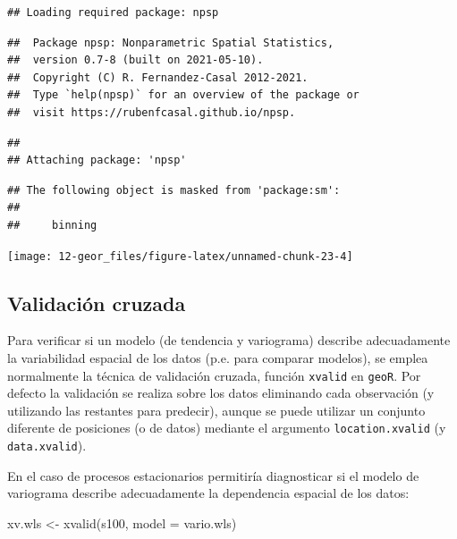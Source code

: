 \documentclass[
  spanish,
]{book}
\newenvironment{Shaded}{\begin{snugshade}}{\end{snugshade}}
\newcommand{\AttributeTok}[1]{\textcolor[rgb]{0.77,0.63,0.00}{#1}}
\newcommand{\FunctionTok}[1]{\textcolor[rgb]{0.00,0.00,0.00}{#1}}
\newcommand{\NormalTok}[1]{#1}
\newcommand{\OtherTok}[1]{\textcolor[rgb]{0.56,0.35,0.01}{#1}}
\theoremstyle{break}
\theoremstyle{definition}
\theoremstyle{definition}
\theoremstyle{definition}
\theoremstyle{definition}
\theoremstyle{remark}
\begin{document}
\begin{verbatim}
## Loading required package: npsp
\end{verbatim}

\begin{verbatim}
##  Package npsp: Nonparametric Spatial Statistics,
##  version 0.7-8 (built on 2021-05-10).
##  Copyright (C) R. Fernandez-Casal 2012-2021.
##  Type `help(npsp)` for an overview of the package or
##  visit https://rubenfcasal.github.io/npsp.
\end{verbatim}

\begin{verbatim}
## 
## Attaching package: 'npsp'
\end{verbatim}

\begin{verbatim}
## The following object is masked from 'package:sm':
## 
##     binning
\end{verbatim}

\begin{center}\texttt{[image: 12-geor\_files/figure-latex/unnamed-chunk-23-4]} \end{center}

\hypertarget{validaciuxf3n-cruzada}{%
\subsection{Validación cruzada}\label{validaciuxf3n-cruzada}}

Para verificar si un modelo (de tendencia y variograma) describe adecuadamente
la variabilidad espacial de los datos (p.e. para comparar modelos), se emplea
normalmente la técnica de validación cruzada, función \texttt{xvalid} en \texttt{geoR}.
Por defecto la validación se realiza sobre los datos eliminando cada
observación (y utilizando las restantes para predecir), aunque se puede
utilizar un conjunto diferente de posiciones (o de datos) mediante el
argumento \texttt{location.xvalid} (y \texttt{data.xvalid}).

En el caso de procesos estacionarios permitiría diagnosticar si el modelo de
variograma describe adecuadamente la dependencia espacial de los datos:

\begin{Shaded}
\begin{Highlighting}[]
\NormalTok{xv.wls }\OtherTok{\textless{}{-}} \FunctionTok{xvalid}\NormalTok{(s100, }\AttributeTok{model =}\NormalTok{ vario.wls)}
\end{Highlighting}
\end{Shaded}
\end{document}
